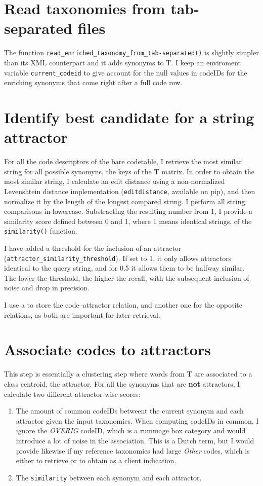 \documentclass[12pt]{article}%
\begin{document}
\section{Read taxonomies from tab-separated files}
The function \texttt{read\_enriched\_taxonomy\_from\_tab-separated()} is slightly simpler than its XML counterpart and it adds synonyms to T. I keep an enviroment variable \texttt{current\_codeid} to give account for the null values in codeIDs for the enriching synonyms that come right after a full code row. 

\section{Identify best candidate for a string attractor}
For all the code descriptors of the bare codetable, I retrieve the most similar string for all possible synomyns, the keys of the T matrix. In order to obtain the most similar string, I calculate an edit distance using a non-normalized Levenshtein distance implementation (\texttt{editdistance}, available on pip), and then normalize it by the length of the longest compared string.  I perform all string comparisons in lowercase. Substracting the resulting number from 1, I provide a similarity score defined between 0 and 1, where 1 means identical strings, cf the \texttt{similarity()} function.


I have added a threshold for the inclusion of an attractor (\texttt{attractor\_similarity\_threshold}). If set to 1, it only allows attractors identical to the query string, and for 0.5 it allows them to be halfway similar. The lower the threshold, the higher the recall, with the subsequent inclusion of noise and drop in precision.

I use a  to store the code--attractor relation, and another one for the opposite relations, as both are important for later retrieval.


\section{Associate codes to attractors}
This step is essentially a clustering step where words from T are associated to a class centroid, the attractor. For all the synonyms that are \textbf{not} attractors, I calculate two different attractor-wise scores:
\begin{enumerate}
\item The amount of common codeIDs betweent the current synonym and each attractor given the input taxonomies. When computing codeIDs in common, I ignore the \textit{OVERIG} codeID, which is a rummage box category and would introduce a lot of noise in the association. This is a Dutch term, but I would provide likewise if my reference taxonomies had large \textit{Other} codes, which is either to retrieve or to obtain as a client indication.
\item The \texttt{similarity} between each synonym and each attractor.
\end{enumerate}
\end{document}
